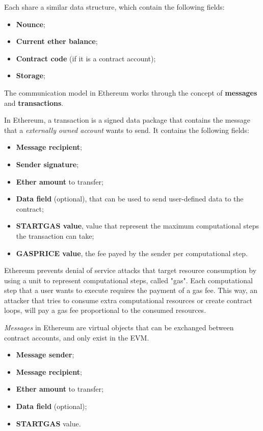 Each share a similar data structure, which contain the following fields:
\begin{itemize}
	\item \textbf{Nounce};
	\item \textbf{Current ether balance};
	\item \textbf{Contract code} (if it is a contract account);
	\item \textbf{Storage};
\end{itemize}

The communication model in Ethereum works through the concept of \textbf{messages} and \textbf{transactions}.

In Ethereum, a transaction is a signed data package that contains the message that a \textit{externally owned account} wants to send. It contains the following fields:

\begin{itemize}
	\item \textbf{Message recipient};
	\item \textbf{Sender signature};
	\item \textbf{Ether amount} to transfer;
	\item \textbf{Data field} (optional), that can be used to send user-defined data to the contract;
	\item \textbf{STARTGAS value}, value that represent the maximum computational steps the transaction can take;
	\item \textbf{GASPRICE value}, the fee payed by the sender per computational step.
\end{itemize}

Ethereum prevents denial of service attacks that target resource consumption by using a unit to represent computational steps, called "gas".
Each computational step that a user wants to execute requires the payment of a gas fee.
This way, an attacker that tries to consume extra computational resources or create contract loops, will pay a gas fee proportional to the consumed resources.

\textit{Messages} in Ethereum are virtual objects that can be exchanged between contract accounts, and only exist in the \ac{EVM}.

\begin{itemize}
	\item \textbf{Message sender};
	\item \textbf{Message recipient};
	\item \textbf{Ether amount} to transfer;
	\item \textbf{Data field} (optional);
	\item \textbf{STARTGAS} value.
\end{itemize}

